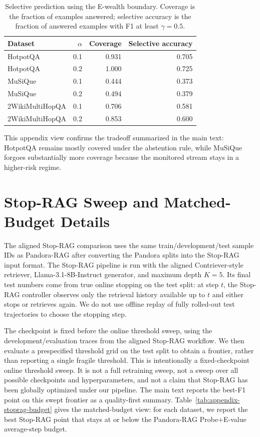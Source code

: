 \documentclass{article}
\newcommand{\method}{Pandora-RAG}
\newcommand{\hotpot}{HotpotQA}
\newcommand{\musique}{MuSiQue}
\newcommand{\twowiki}{2WikiMultiHopQA}
\begin{document}
\begin{table}[htbp]
  \caption{Selective prediction using the E-wealth boundary. Coverage is the fraction of examples answered; selective accuracy is the fraction of answered examples with F1 at least $\gamma=0.5$.}
  \label{tab:appendix-selective}
  \centering
  \small
  \begin{tabular}{lrrr}
    \toprule
    Dataset & $\alpha$ & Coverage & Selective accuracy \\
    \midrule
    \hotpot{} & 0.1 & 0.931 & 0.705 \\
    \hotpot{} & 0.2 & 1.000 & 0.725 \\
    \musique{} & 0.1 & 0.444 & 0.373 \\
    \musique{} & 0.2 & 0.494 & 0.379 \\
    \twowiki{} & 0.1 & 0.706 & 0.581 \\
    \twowiki{} & 0.2 & 0.853 & 0.600 \\
    \bottomrule
  \end{tabular}
\end{table}

This appendix view confirms the tradeoff summarized in the main text: \hotpot{} remains mostly covered under the abstention rule, while \musique{} forgoes substantially more coverage because the monitored stream stays in a higher-risk regime.

\section{Stop-RAG Sweep and Matched-Budget Details}
\label{app:stoprag-supp}

The aligned Stop-RAG comparison uses the same train/development/test sample IDs as \method{} after converting the Pandora splits into the Stop-RAG input format. The Stop-RAG pipeline is run with the aligned Contriever-style retriever, Llama-3.1-8B-Instruct generator, and maximum depth $K=5$. Its final test numbers come from true online stopping on the test split: at step $t$, the Stop-RAG controller observes only the retrieval history available up to $t$ and either stops or retrieves again. We do not use offline replay of fully rolled-out test trajectories to choose the stopping step.

The checkpoint is fixed before the online threshold sweep, using the development/evaluation traces from the aligned Stop-RAG workflow. We then evaluate a prespecified threshold grid on the test split to obtain a frontier, rather than reporting a single fragile threshold. This is intentionally a fixed-checkpoint online threshold sweep. It is not a full retraining sweep, not a sweep over all possible checkpoints and hyperparameters, and not a claim that Stop-RAG has been globally optimized under our pipeline. The main text reports the best-F1 point on this swept frontier as a quality-first summary. Table~\ref{tab:appendix-stoprag-budget} gives the matched-budget view: for each dataset, we report the best Stop-RAG point that stays at or below the \method{} Probe+E-value average-step budget.
\end{document}
